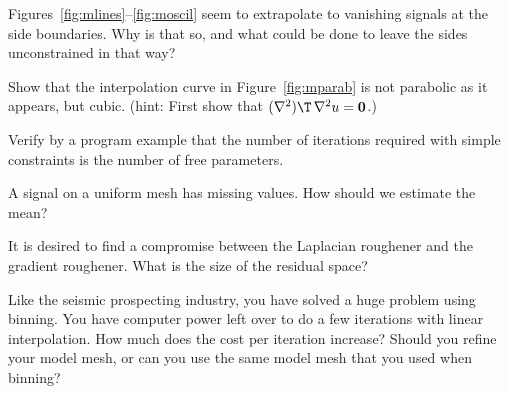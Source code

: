 \begin{exer}
\item
        Figures~\ref{fig:mlines}--\ref{fig:moscil}
        seem to extrapolate to vanishing signals at the side boundaries.
        Why is that so, and what could be done to leave the sides
        unconstrained in that way?
\item
        Show that the interpolation curve in Figure~\ref{fig:mparab} is not
        parabolic as it appears, but cubic.
        ({\sc hint}:  First show that $(\nabla^2)\T\,\nabla^2 u = \bold 0$.)
        \item
        Verify by a program example that the number of iterations
        required with simple constraints is the number of free parameters.
\item
        A signal on a uniform mesh has missing values.
        How should we estimate the mean?
\item
        It is desired to find a compromise between
        the Laplacian roughener
        and the gradient roughener.
        What is the size of the residual space?
\item
        Like the seismic prospecting industry,
        you have solved a huge problem using binning.
        You have computer power left over
        to do a few iterations with linear interpolation.
        How much does the cost per iteration increase?
        Should you refine your model mesh,
        or can you use the same model mesh
        that you used when binning?
\end{exer}


\clearpage

